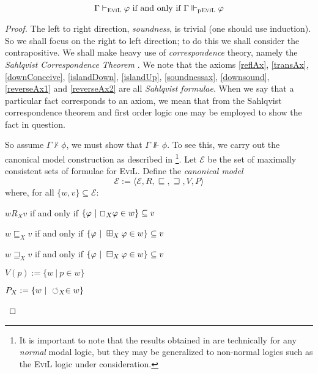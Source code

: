 \begin{theorem}\label{partly-evil-completeness}

$$\Gamma \vdash_{\textsc{EviL}} \phi\textup{ if and only if }\Gamma
\Vdash_{\textup{p\textsc{EviL}}} \phi$$

\end{theorem}
\begin{proof}
The left to right direction, \emph{soundness}, is trivial (one should
use induction).  So we shall focus on the right to left direction; 
to do this we shall consider the contrapositive.  We shall make heavy
use of \emph{correspondence} theory, namely the \emph{Sahlqvist
  Correspondence Theorem} \cite[Theorem 4.42,
pg. 212]{blackburn_modal_2001}.  We note that the axioms
\eqref{reflAx}, \eqref{transAx}, \eqref{downConceive}, \eqref{islandDown},
\eqref{islandUp}, \eqref{soundnessax}, \eqref{downsound},
\eqref{reverseAx1} and
\eqref{reverseAx2} are all
\emph{Sahlqvist formulae}.  When we say that a particular fact corresponds to an
axiom, we mean that from the Sahlqvist correspondence theorem and
first order logic one may be employed to show the fact in question.

So assume $\Gamma \nvdash \phi$, 
we must show that $\Gamma \nVdash \phi$.  
To see this, we carry out the canonical model construction as
described in \cite[chapter 4,
pgs. 198--422]{blackburn_modal_2001}\footnote{It is important to note
  that the results obtained in \cite{blackburn_modal_2001} are technically for any \emph{normal} modal logic,
  but they may be generalized to non-normal logics such as the
  \textsc{EviL} logic under consideration.}.  Let $\mathcal{E}$ be the set of maximally
  consistent sets of formulae for \textsc{EviL}. Define the
  \emph{canonical model}
  $$\mathscr{E} := 
\langle \mathcal{E}, R, \sqsubseteq, \sqsupseteq, V, P \rangle$$
where, for all $\{w,v\} \subseteq \mathcal{E}$:
\begin{bul}
  \item $w R_X v$ if and only if $\{ \phi\ |\ \Nec_X \phi \in w\}
    \subseteq v$
  \item $w \sqsubseteq_X v$ if and only if $\{ \phi\ |\ \BP_X \phi \in w\}
    \subseteq v$
  \item $w \sqsupseteq_X v$ if and only if $\{ \phi\ |\ \BM_X \phi \in w\}
    \subseteq v$
  \item $V(p) := \{ w \ |\ p \in w\}$
  \item $P_X := \{ w \ |\ \PP_X \in w \}$
\end{bul}


\end{proof}
